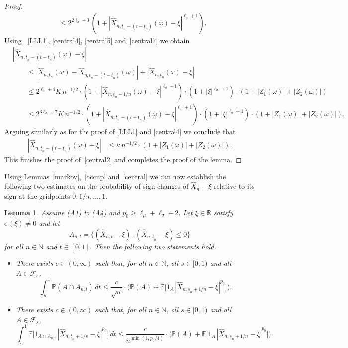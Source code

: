 \documentclass[11pt]{amsart}
\newcommand{\R}{{\mathbb R}}
\newcommand{\N}{{\mathbb N}}
\newcommand{\EE}{{\mathbb E}}
\newcommand{\PP}{{\mathbb P}}
\newcommand{\eul}{{\widehat X}}
\newcommand{\ind}{1}
\newcommand{\usn}{\underline {s}_n}
\newcommand{\utn}{\underline {t}_n}
\newcommand{\F}{{\mathcal F}}
\theoremstyle{plain}
\newtheorem{lemma}{Lemma}
\theoremstyle{definition}
\begin{document}
\begin{proof}
\begin{equation}
\begin{aligned}
&\leq 2^{2\ell_\sigma+3} \,(1+|\eul_{n,\utn-(t-\utn)}(\omega) -\xi| ^{\ell_\sigma+1}).
\end{aligned}
\end{equation}
Using~ \eqref{LLL1}, \eqref{central4}, \eqref{central5} and~\eqref{central7} we obtain
\begin{align*}
& |\eul_{n,\utn-(t-\utn)}(\omega) -\xi|\\
 &\qquad   \le |\eul_{n,\utn}(\omega)-\eul_{n,\utn-(t-\utn)}(\omega)| +|\eul_{n,\utn}(\omega)-\xi|\\
& \qquad  \le 2^{\ell_\sigma+4}K\, n^{-1/2} \cdot (1+|\eul_{n,\utn-1/n}(\omega)-\xi|^{\ell_\sigma+1})\cdot  (1+|\xi|^{\ell_\sigma+1})\cdot  (1+|Z_1(\omega)|+|Z_2(\omega)|)\\
& \qquad  \leq 2^{3\ell_\sigma+7}K\, n^{-1/2} \cdot (1+|\eul_{n,\utn-(t-\utn)}(\omega) -\xi|^{\ell_\sigma+1})\cdot  (1+|\xi|^{\ell_\sigma+1})\cdot  (1+|Z_1(\omega)|+|Z_2(\omega)|).
\end{align*}
Arguing  similarly as for the proof of \eqref{LLL1} and \eqref{central4} we conclude that
\begin{align*}
|\eul_{n,\utn-(t-\utn)}(\omega) -\xi| &\le \kappa\, n^{-1/2}\cdot  (1+|Z_1(\omega)|+|Z_2(\omega)|).
\end{align*}
This finishes the proof of~\eqref{central2} and completes the proof of the lemma.
\end{proof}





Using Lemmas~\ref{markov},~\ref{occup} and~\ref{central} we can now establish the following two estimates on the probability of sign changes of $\eul_{n}-\xi$ relative to its sign at the gridpoints $0,1/n,\dots,1$.

\begin{lemma}\label{key}
Assume (A1) to (A4) and $p_0\ge  \ell_\mu+\ell_\sigma +2$.
Let $\xi\in\R$ satisfy $\sigma(\xi)\neq 0$ and let
\[
A_{n,t} =\{(\eul_{n,t}-\xi)\cdot(\eul_{n, \utn}-\xi)\leq 0\}
\]
for all $n\in\N$ and $t\in[0,1]$.
Then the following
two
statements hold.
\begin{itemize}
\item[(i)] There exists $c\in(0, \infty)$ such that, for all $n\in\N$, all $s\in [0,1)$ and all $A\in \F_s$,
\[
 \int_{s}^1\PP(A \cap A_{n,t})\, dt \le \frac{c}{\sqrt n} \cdot \bigl( \PP(A) + \EE\bigl[\ind_A \, |\eul_{n,\usn+1/n}-\xi|^{p_0}\bigr]\bigr).
\]
\item[(ii)] There exists $c\in(0, \infty)$ such that, for all $n\in\N$, all $s\in[0,1)$ and all $A\in \F_{s}$,
\[
\int_s^1\EE\bigl[\ind_{A\cap A_{n,t}} \, |\eul_{n,\utn+1/n}-\xi|^{p_0}\bigr]\, dt \le  \frac{c}{n^{\min(1,p_0/4)}} \cdot \bigl(\PP(A) + \EE\bigl[\ind_A \, |\eul_{n,\usn+1/n}-\xi|^{p_0}\bigr]\bigr).
\]
\end{itemize}
\end{lemma}
\end{document}
